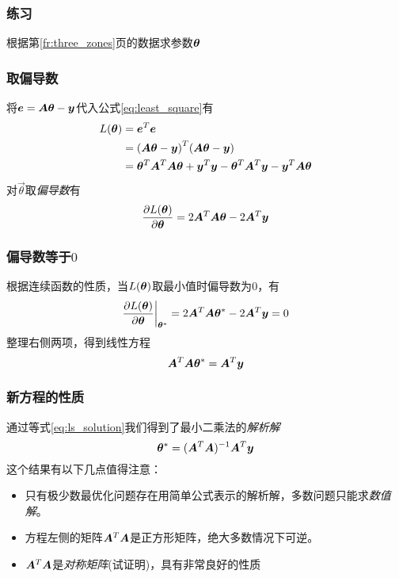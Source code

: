 \documentclass[14pt]{beamer}
\begin{document}
    \begin{frame}
        \frametitle{练习}
        根据第\ref{fr:three_zones}页的数据求参数$\bm{\theta}$
    \end{frame}
    \begin{frame}
        \frametitle{取偏导数}
        将$\bm{e}=\bm{A}\bm{\theta}-\bm{y}$代入公式\ref{eq:least_square}有
        \begin{equation}
            \begin{split}
                L(\bm{\theta})&=\bm{e}^T\bm{e}\\
                &={(\bm{A}\bm{\theta}-\bm{y})}^T(\bm{A}\bm{\theta}-\bm{y})\\
                &=\bm{\theta}^T\bm{A}^T\bm{A}\bm{\theta}+\bm{y}^T\bm{y}-\bm{\theta}^T\bm{A}^T\bm{y}-\bm{y}^T\bm{A}\bm{\theta}
            \end{split}
        \end{equation}
        对$\vec{\theta}$取\emph{偏导数}有
        \begin{equation}
            \frac{\partial L(\bm{\theta})}{\partial\bm{\theta}}=
            2\bm{A}^T\bm{A}\bm{\theta}-2\bm{A}^T\bm{y}
        \end{equation}
    \end{frame}

    \begin{frame}
        \frametitle{偏导数等于$0$}
        根据连续函数的性质，当$L(\bm{\theta})$取最小值时偏导数为$0$，有
        \begin{equation}
            \frac{\partial L(\bm{\theta})}{\partial\bm{\theta}}\bigg|_{\bm{\theta}^*}=
            2\bm{A}^T\bm{A}\bm{\theta}^*-2\bm{A}^T\bm{y}=0
        \end{equation}
        整理右侧两项，得到线性方程
        \begin{equation}\label{eq:ls_solution}
            \bm{A}^T\bm{A}\bm{\theta}^*=\bm{A}^T\bm{y}
        \end{equation}
    \end{frame}

    \begin{frame}
        \frametitle{新方程的性质}
        通过等式\ref{eq:ls_solution}我们得到了最小二乘法的\emph{解析解}
        \begin{equation}
            \bm{\theta}^*=(\bm{A}^T\bm{A})^{-1}\bm{A}^T\bm{y}
        \end{equation}
        这个结果有以下几点值得注意：
        \begin{itemize}
            \item 只有极少数最优化问题存在用简单公式表示的解析解，多数问题只能求\emph{数值解}。
            \item 方程左侧的矩阵$\bm{A}^T\bm{A}$是正方形矩阵，绝大多数情况下可逆。
            \item $\bm{A}^T\bm{A}$是\emph{对称矩阵}(试证明)，具有非常良好的性质
        \end{itemize}
    \end{frame}
\end{document}
